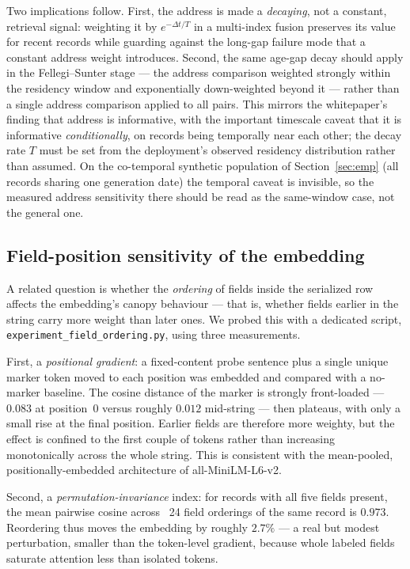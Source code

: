 \documentclass[11pt]{article}
\begin{document}
Two implications follow. First, the address is made a \emph{decaying}, not a constant,
retrieval signal: weighting it by $e^{-\Delta t/T}$ in a multi-index fusion preserves its
value for recent records while guarding against the long-gap failure mode that a constant
address weight introduces. Second, the same age-gap decay should apply in the Fellegi--Sunter
stage --- the address comparison weighted strongly within the residency window and
exponentially down-weighted beyond it --- rather than a single address comparison applied to
all pairs. This mirrors the whitepaper's finding that address is informative, with the
important timescale caveat that it is informative \emph{conditionally}, on records being
temporally near each other; the decay rate $T$ must be set from the deployment's observed
residency distribution rather than assumed. On the co-temporal synthetic population of
Section~\ref{sec:emp} (all records sharing one generation date) the temporal caveat is
invisible, so the measured address sensitivity there should be read as the same-window case,
not the general one.

\subsection{Field-position sensitivity of the embedding}
A related question is whether the \emph{ordering} of fields inside the serialized row affects
the embedding's canopy behaviour --- that is, whether fields earlier in the string carry more
weight than later ones. We probed this with a dedicated script,
\texttt{experiment\_field\_ordering.py}, using three measurements.

First, a \emph{positional gradient}: a fixed-content probe sentence plus a single unique
marker token moved to each position was embedded and compared with a no-marker baseline. The
cosine distance of the marker is strongly front-loaded --- $0.083$ at position~0 versus roughly
$0.012$ mid-string --- then plateaus, with only a small rise at the final position. Earlier
fields are therefore more weighty, but the effect is confined to the first couple of tokens
rather than increasing monotonically across the whole string. This is consistent with the
mean-pooled, positionally-embedded architecture of all-MiniLM-L6-v2.

Second, a \emph{permutation-invariance} index: for records with all five fields present, the
mean pairwise cosine across ~24 field orderings of the same record is $0.973$. Reordering thus
moves the embedding by roughly $2.7\%$ --- a real but modest perturbation, smaller than the
token-level gradient, because whole labeled fields saturate attention less than isolated
tokens.
\end{document}
